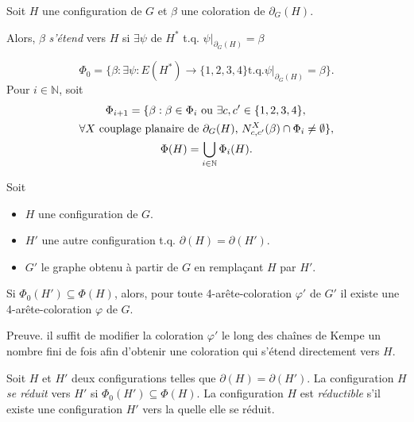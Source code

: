 \documentclass{beamer}
\begin{document}
\begin{frame}
Soit $H$ une configuration de $G$ et $\beta$ une coloration de $\partial_G(H)$. 

Alors, $\beta$ \emph{s'étend} vers $H$ si $\exists \psi$ de $H^*$  t.q.   $\psi|_{\partial_G(H)}= \beta$

$$
\Phi_0 = \{\beta : \exists \psi : E(H^*)\to\{1,2,3,4\} \textrm{t.q.} \psi|_{\partial_G(H)} = \beta\}.
$$
Pour $i\in\mathbb{N}$, soit
$$
\gathered
\Phi_{i+1} = 
\{ 
\beta : 
\beta\in \Phi_i
\textrm{ ou }
\exists c,c'\in \{1,2,3,4\},\,\\ 
\forall X\textrm{ couplage planaire de $\partial_G(H)$, }
N^X_{c,c'}(\beta) \cap \Phi_i \neq \emptyset 
\},\\
\Phi(H)=\bigcup_{i\in \mathbb{N}} \Phi_i(H).
\endgathered
$$
\end{frame}

\begin{frame}
\begin{theorem}
Soit 
\begin{itemize}
\item $H$ une configuration de $G$. 
\item $H'$ une autre configuration t.q. $\partial(H)=\partial(H')$.
\item $G'$ le graphe obtenu à partir de $G$ en remplaçant $H$ par $H'$.
\end{itemize}

Si $\Phi_0(H')\subseteq \Phi(H)$, alors, pour toute 4-arête-coloration $\varphi'$ de $G'$ il existe une 4-arête-coloration $\varphi$ de $G$.
\end{theorem}

Preuve.
il suffit de modifier la coloration $\varphi'$ le long des chaînes de Kempe un nombre fini de fois afin d'obtenir une coloration qui s'étend directement vers $H$.
\end{frame}

\begin{frame}
Soit $H$ et $H'$ deux configurations telles que $\partial(H)=\partial(H')$. La configuration $H$ \emph{se réduit} vers $H'$ si $\Phi_0(H')\subseteq \Phi(H)$. La configuration $H$ est \emph{réductible} s'il existe une configuration $H'$ vers la quelle elle se réduit.

%
\end{frame}
\end{document}
